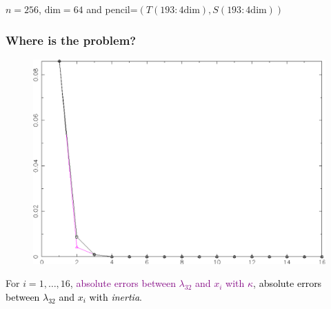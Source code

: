 \documentclass{beamer}
\theoremstyle{definition} \newtheorem{de}{Def}
\theoremstyle{remark} \newtheorem{os}[de]{Remark}
\theoremstyle{plain} \newtheorem{te}[de]{Teo}
\theoremstyle{plain} \newtheorem{co}[de]{Cor}
\theoremstyle{plain} \newtheorem{pr}[de]{Prop}
\theoremstyle{plain} \newtheorem{lem}[de]{Lemm}
\theoremstyle{remark} \newtheorem{rem}[de]{Remark}
\begin{document}
\begin{frame}

  $n=256$, $\text{dim}=64$ and pencil=$(T(193:4\text{dim}),S(193:4\text{dim}))$

  \frametitle{Where is the problem?}
  \begin{figure}
    \centering
    \includegraphics[scale=0.3]{images/ConfrontoLagItInerziaKappa.pdf}
  \end{figure}

For $i=1,\dots,16$, \textcolor{purple}{absolute errors between $\lambda_{32}$ and $x_i$ with $\kappa$}, \textcolor{black}{absolute errors between $\lambda_{32}$ and $x_i$ with \emph{inertia}}.

\end{frame}
\end{document}

